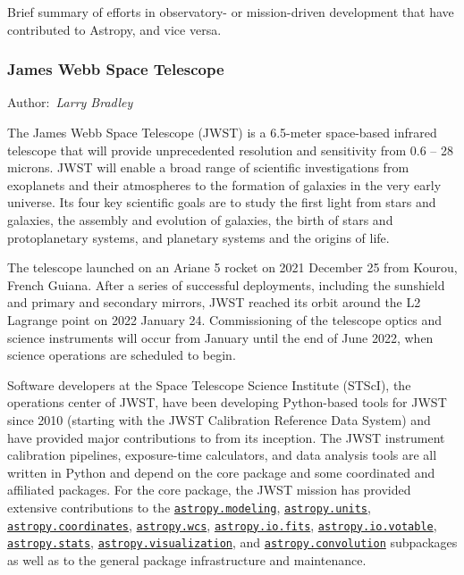 \documentclass[modern]{aastex631}
\newcommand{\astropysubpkg}[1]{\href{http://docs.astropy.org/en/stable/#1/index.html}{\texttt{astropy.#1}}\xspace}
\newcommand{\secauthor}[1]{{\color{blue}Author:~\textit{#1}}}
\begin{document}
Brief summary of efforts in observatory- or mission-driven development that have
contributed to Astropy, and vice versa.

\subsubsection{James Webb Space Telescope}
\secauthor{Larry Bradley}

The James Webb Space Telescope (JWST) is a 6.5-meter space-based
infrared telescope that will provide unprecedented resolution and
sensitivity from 0.6 -- 28 microns. JWST will enable a broad range
of scientific investigations from exoplanets and their atmospheres
to the formation of galaxies in the very early universe. Its four
key scientific goals are to study the first light from stars and
galaxies, the assembly and evolution of galaxies, the birth of stars and
protoplanetary systems, and planetary systems and the origins of life.

The telescope launched on an Ariane 5 rocket on 2021 December 25 from
Kourou, French Guiana. After a series of successful deployments,
including the sunshield and primary and secondary mirrors, JWST reached
its orbit around the L2 Lagrange point on 2022 January 24. Commissioning
of the telescope optics and science instruments will occur from January
until the end of June 2022, when science operations are scheduled to
begin.

Software developers at the Space Telescope Science Institute (STScI),
the operations center of JWST, have been developing Python-based tools
for JWST since 2010 (starting with the JWST Calibration Reference Data
System) and have provided major contributions to \astropy from its
inception. The JWST instrument calibration pipelines, exposure-time
calculators, and data analysis tools are all written in Python and
depend on the \astropypkg core package and some coordinated and
affiliated packages. For the \astropypkg core package, the JWST mission
has provided extensive contributions to the \astropysubpkg{modeling},
\astropysubpkg{units}, \astropysubpkg{coordinates}, \astropysubpkg{wcs},
\astropysubpkg{io.fits}, \astropysubpkg{io.votable},
\astropysubpkg{stats}, \astropysubpkg{visualization}, and
\astropysubpkg{convolution} subpackages as well as to the general
package infrastructure and maintenance.
\end{document}
